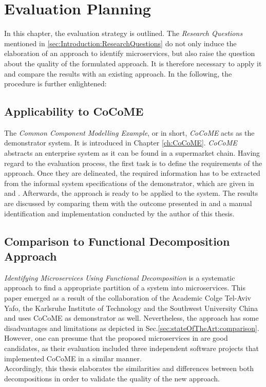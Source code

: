 \chapter{Evaluation Planning}
\label{ch:EvalutationPlanning}
In this chapter, the evaluation strategy is outlined. The \textit{Research Questions} mentioned in \ref{sec:Introduction:ResearchQuestions} do not only induce the elaboration of an approach to identify microservices, but also raise the question about the quality of the formulated approach. It is therefore necessary to apply it and compare the results with an existing approach. In the following, the procedure is further enlightened:

\section{Applicability to CoCoME}
\label{sec:EvaluationPlanning:ApplicabilityToCoCoME}
The \textit{Common Component Modelling Example}, or in short, \textit{CoCoME} acts as the demonstrator system. It is  introduced in Chapter \ref{ch:CoCoME}. \textit{CoCoME} abstracts an enterprise system as it can be found in a supermarket chain. Having regard to the evaluation process, the first task is to define the requirements of the approach. Once they are delineated, the required information has to be extracted from the informal system specifications of the demonstrator, which are given in \cite{CoCoMEOld} and \cite{CoCoMETechnical}. Afterwards, the approach is ready to be applied to the system. The results are discussed by comparing them with the outcome presented in \cite{FunctionalDecompositionHeinrich} and a manual identification and implementation conducted by the author of this thesis.


\section{Comparison to Functional Decomposition Approach}
\textit{Identifying Microservices Using Functional Decomposition} \cite{FunctionalDecompositionHeinrich} is a systematic approach to find a appropriate partition of a system into microservices. This paper emerged as a result of the collaboration of the Academic Colge Tel-Aviv Yafo, the Karlsruhe Institute of Technology and the Southwest University China and uses CoCoME as demonstrator as well. Nevertheless, the approach has some disadvantages and limitations as depicted in Sec.\ref{sec:stateOfTheArt:comparison}. 
\\
However, one can presume that the proposed microservices in \cite{FunctionalDecompositionHeinrich} are good candidates, as their evaluation included three independent software projects that implemented CoCoME in a similar manner. \\
Accordingly, this thesis elaborates the similarities and differences between both decompositions in order to validate the quality of the new approach.
